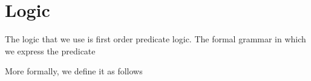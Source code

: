 

\section{Logic} 
The logic that we use is first order predicate  logic. 
The formal grammar in which we express the predicate  

 More formally, we define it as follows 

$$

$$



